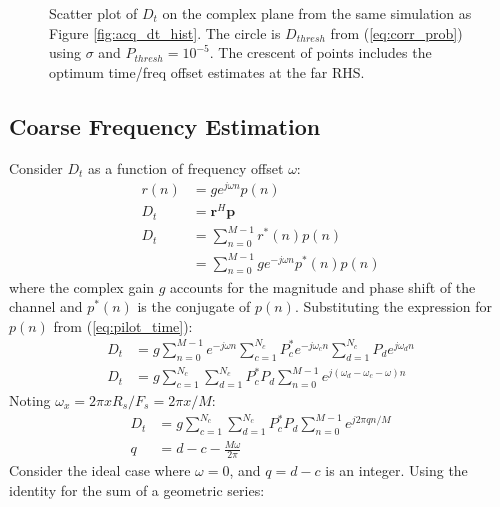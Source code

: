 \documentclass{article}
\begin{document}
\begin{figure}[H]
\caption{Scatter plot of $D_t$ on the complex plane from the same simulation as Figure \ref{fig:acq_dt_hist}. The circle is $D_{thresh}$ from (\ref{eq:corr_prob}) using $\sigma$ and $P_{thresh}=10^{-5}$. The crescent of points includes the optimum time/freq offset estimates at the far RHS.}
\label{fig:acq_dt_scatter}
\begin{center}

\end{center}
\end{figure}

\subsection{Coarse Frequency Estimation}

Consider $D_t$ as a function of frequency offset $\omega$:
\begin{equation}
\label{eq:dt_freq}
\begin{split}
r(n) &= ge^{j \omega n}p(n) \\
D_t  &= \bm{r}^H\bm{p} \\
D_t  &= \sum_{n=0}^{M-1}r^*(n)p(n) \\
     &= \sum_{n=0}^{M-1}ge^{-j \omega n}p^*(n)p(n) 
\end{split}
\end{equation}
where the complex gain $g$ accounts for the magnitude and phase shift of the channel and $p^*(n)$ is the conjugate of $p(n)$.  Substituting the expression for $p(n)$ from (\ref{eq:pilot_time}):
\begin{equation}
\begin{split}
D_t &= g\sum_{n=0}^{M-1}e^{-j \omega n} \sum_{c=1}^{N_c}P^*_c e^{-j \omega_c n} \sum_{d=1}^{N_c}P_d e^{j \omega_d n} \\
D_t &= g \sum_{c=1}^{N_c} \sum_{d=1}^{N_c}P^*_c P_d\sum_{n=0}^{M-1}e^{j (\omega_d - \omega_c - \omega) n}
\end{split}
\end{equation}
Noting $\omega_x = 2 \pi x R_s/F_s = 2 \pi x/M$:
\begin{equation}
\begin{split}
D_t &= g \sum_{c=1}^{N_c} \sum_{d=1}^{N_c}P^*_c P_d\sum_{n=0}^{M-1}e^{j 2 \pi q n/M} \\
  q &= d - c - \frac{M \omega}{ 2 \pi}
\end{split}
\end{equation}
Consider the ideal case where $\omega=0$, and $q = d-c$ is an integer. Using the identity for the sum of a geometric series:
\end{document}
